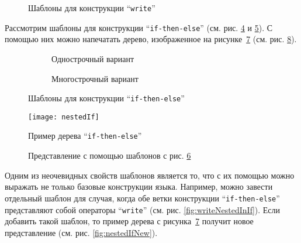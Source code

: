 \begin{figure}[h!]
	\begin{subfigure}[h]{0.45\textwidth}
		
		\caption{}
		\label{fig:writeTmplt1}
	\end{subfigure}
	\begin{subfigure}[h]{0.45\textwidth}
		
		\caption{}
		\label{fig:writeTmplt2}
	\end{subfigure}
	\caption{Шаблоны для конструкции “\lstinline{write}”}
\end{figure}

Рассмотрим шаблоны для конструкции “\lstinline{if-then-else}” (см. рис. \ref{fig:flatGoodIfTmplt} и \ref{fig:multBadIfTmplt}).
С помощью них можно напечатать дерево, изображенное на рисунке~\ref{fig:nestedIf} (см. рис. \ref{fig:nestedIfCode}).

\begin{figure}[h!]
	\begin{subfigure}[h]{0.45\textwidth}
		
		\caption{Однострочный вариант}
		\label{fig:flatGoodIfTmplt}
	\end{subfigure}
	
	\begin{subfigure}[h]{0.45\textwidth}
		
		\caption{Многострочный вариант}
		\label{fig:multBadIfTmplt}
	\end{subfigure}
	\caption{Шаблоны для конструкции “\lstinline{if-then-else}”}
	\label{fig:ifTmplt}
\end{figure}

\begin{figure}[h!]
	\centering
	\texttt{[image: nestedIf]}
	\caption{Пример дерева “\lstinline{if-then-else}”}
	\label{fig:nestedIf}
\end{figure}

\begin{figure}[h!]
	\centering
	
	\caption{Представление с помощью шаблонов с рис. \ref{fig:ifTmplt}}
	\label{fig:nestedIfCode}
\end{figure}

Одним из неочевидных свойств шаблонов является то, что с их помощью можно выражать не только базовые конструкции языка.
Например, можно завести отдельный шаблон для случая, когда обе ветки конструкции “\lstinline{if-then-else}” представляют собой операторы “\lstinline{write}” (см. рис. \ref{fig:writeNestedInIf}). Если добавить такой шаблон, то пример дерева с рисунка~\ref{fig:nestedIf} получит новое представление (см. рис. \ref{fig:nestedIfNew}).

